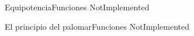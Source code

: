 \documentclass[spanish, c]{beamer}
\begin{document}
\begin{frame}{Equipotencia}{Funciones}
    NotImplemented

\end{frame}

\begin{frame}{El principio del palomar}{Funciones}
    NotImplemented

\end{frame}






\end{document}
